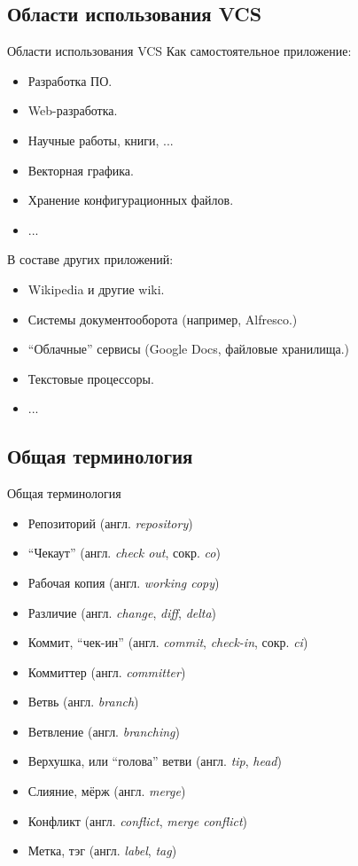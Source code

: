 \documentclass[presentation]{beamer}
\begin{document}


\subsection{Области использования VCS}

\begin{frame}{Области использования VCS}
  Как самостоятельное приложение:
  \begin{itemize}
  \item Разработка ПО.
  \item Web-разработка.
  \item Научные работы, книги, ...
  \item Векторная графика.
  \item Хранение конфигурационных файлов.
  \item ...
  \end{itemize}
  В составе других приложений:
  \begin{itemize}
  \item Wikipedia и другие wiki.
  \item Системы документооборота (например, Alfresco.)
  \item ``Облачные'' сервисы (Google Docs, файловые хранилища.)
  \item Текстовые процессоры.
  \item ...
  \end{itemize}
\end{frame}



\subsection{Общая терминология}

\begin{frame}{Общая терминология}
  \begin{itemize}
  \item Репозиторий (англ. \emph{repository})
  \item ``Чекаут'' (англ. \emph{check out}, сокр. \emph{co})
  \item Рабочая копия (англ. \emph{working copy})
  \item Различие (англ. \emph{change}, \emph{diff}, \emph{delta})
  \item Коммит, ``чек-ин'' (англ. \emph{commit}, \emph{check-in},
    сокр. \emph{ci})
  \item Коммиттер (англ. \emph{committer})
  \item Ветвь (англ. \emph{branch})
  \item Ветвление (англ. \emph{branching})
  \item Верхушка, или ``голова'' ветви (англ. \emph{tip}, \emph{head})
  \item Слияние, мёрж (англ. \emph{merge})
  \item Конфликт (англ. \emph{conflict}, \emph{merge conflict})
  \item Метка, тэг (англ. \emph{label}, \emph{tag})
  \end{itemize}
\end{frame}
\end{document}
